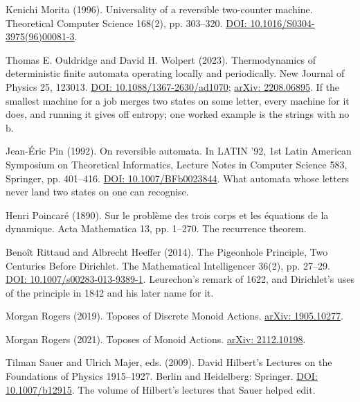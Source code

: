 \documentclass[11pt,twoside]{article}
\theoremstyle{thielethm}
\theoremstyle{thieledef}
\theoremstyle{thieledef}
\theoremstyle{thieledef}
\theoremstyle{thielethm}
\theoremstyle{thieleobs}
\theoremstyle{thielethm}
\begin{document}
\noindent Kenichi Morita (1996). Universality of a reversible two-counter machine. Theoretical Computer Science 168(2), pp. 303--320. \href{https://doi.org/10.1016/S0304-3975(96)00081-3}{DOI: 10.1016/S0304-3975(96)00081-3}.
\par\medskip

\noindent Thomas E. Ouldridge and David H. Wolpert (2023). Thermodynamics of deterministic finite automata operating locally and periodically. New Journal of Physics 25, 123013. \href{https://doi.org/10.1088/1367-2630/ad1070}{DOI: 10.1088/1367-2630/ad1070}; \href{https://arxiv.org/abs/2208.06895}{arXiv: 2208.06895}. If the smallest machine for a job merges two states on some letter, every machine for it does, and running it gives off entropy; one worked example is the strings with no b.
\par\medskip

\noindent Jean-\'Eric Pin (1992). On reversible automata. In LATIN '92, 1st Latin American Symposium on Theoretical Informatics, Lecture Notes in Computer Science 583, Springer, pp. 401--416. \href{https://doi.org/10.1007/BFb0023844}{DOI: 10.1007/BFb0023844}. What automata whose letters never land two states on one can recognise.
\par\medskip

\noindent Henri Poincar\'e (1890). Sur le probl\`eme des trois corps et les \'equations de la dynamique. Acta Mathematica 13, pp. 1--270. The recurrence theorem.
\par\medskip

\noindent Beno\^it Rittaud and Albrecht Heeffer (2014). The Pigeonhole Principle, Two Centuries Before Dirichlet. The Mathematical Intelligencer 36(2), pp. 27--29. \href{https://doi.org/10.1007/s00283-013-9389-1}{DOI: 10.1007/s00283-013-9389-1}. Leurechon's remark of 1622, and Dirichlet's uses of the principle in 1842 and his later name for it.
\par\medskip

\noindent Morgan Rogers (2019). Toposes of Discrete Monoid Actions. \href{https://arxiv.org/abs/1905.10277}{arXiv: 1905.10277}.
\par\medskip

\noindent Morgan Rogers (2021). Toposes of Monoid Actions. \href{https://arxiv.org/abs/2112.10198}{arXiv: 2112.10198}.
\par\medskip

\noindent Tilman Sauer and Ulrich Majer, eds. (2009). David Hilbert's Lectures on the Foundations of Physics 1915--1927. Berlin and Heidelberg: Springer. \href{https://doi.org/10.1007/b12915}{DOI: 10.1007/b12915}. The volume of Hilbert's lectures that Sauer helped edit.
\par\medskip
\end{document}
